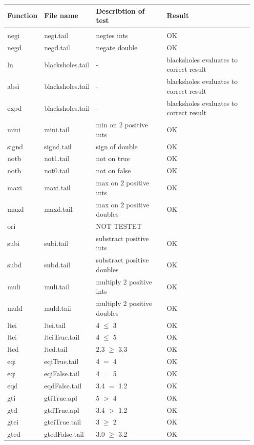 \documentclass[11pt]{article}
\begin{document}
\begin{center}
\begin{tabular}{l l l l}
Function  		& File name		& Describtion of test			& Result \\ \hline \\
negi			& negi.tail			& negtes ints				& OK \\
negd 		& negd.tail			& negate double				& OK \\
ln 			& blacksholes.tail	& -					& blacksholes evaluates to correct result \\
absi 			& blacksholes.tail	& -					& blacksholes evaluates to correct result \\
expd 		& blacksholes.tail	& -					& blacksholes evaluates to correct result \\
mini 			& mini.tail			& min on 2 positive ints		& OK \\
signd 		& signd.tail			& sign of double				& OK \\
notb			& not1.tail			& not on true				& OK \\
notb			& not0.tail			& not on false				& OK \\
maxi			& maxi.tail			& max on 2 positive ints		& OK \\
maxd		& maxd.tail		& max on 2 positive doubles	& OK \\
ori			& 				& NOT TESTET				&  \\
subi			& subi.tail			& substract positive ints		& OK \\
subd			& subd.tail			& substract positive doubles	& OK \\
muli			& muli.tail			& multiply 2 positive ints		& OK \\
muld			& muld.tail			& multiply 2 positive doubles	& OK \\
ltei			& ltei.tail			& 4 $\leq$ 3				& OK \\
ltei			& lteiTrue.tail		& 4 $\leq$ 5				& OK \\
lted			& lted.tail			& 2.3 $\geq$ 3.3				& OK \\
eqi			& eqiTrue.tail		& 4 $=$ 4					& OK \\
eqi 			& eqiFalse.tail		& 4 $=$ 5					& OK \\
eqd			& eqdFalse.tail		& 3.4 $=$ 1.2				& OK \\
gti			& gtiTrue.apl		& 5 $>$ 4					& OK \\
gtd			& gtdTrue.apl		& 3.4 $>$ 1.2				& OK \\
gtei			& gteiTrue.tail		& 3 $\geq$ 2				& OK \\
gted			& gtedFalse.tail		& 3.0 $\geq$ 3.2				& OK \\

\end{tabular}
\end{center}
\end{document}

